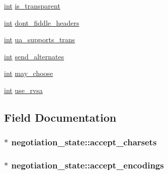 \begin{DoxyCompactItemize}
\item 
\hyperlink{pcre_8txt_a42dfa4ff673c82d8efe7144098fbc198}{int} \hyperlink{structnegotiation__state_aefbdd6257c23b35981e969ee62f8b8cf}{is\+\_\+transparent}
\item 
\hyperlink{pcre_8txt_a42dfa4ff673c82d8efe7144098fbc198}{int} \hyperlink{structnegotiation__state_ac546c8dabe2405c173572249af1453be}{dont\+\_\+fiddle\+\_\+headers}
\item 
\hyperlink{pcre_8txt_a42dfa4ff673c82d8efe7144098fbc198}{int} \hyperlink{structnegotiation__state_a99b8e250b291c99421c16c47163d8c01}{ua\+\_\+supports\+\_\+trans}
\item 
\hyperlink{pcre_8txt_a42dfa4ff673c82d8efe7144098fbc198}{int} \hyperlink{structnegotiation__state_a33db111ded7aa5a6a4f8a1aadbfc480f}{send\+\_\+alternates}
\item 
\hyperlink{pcre_8txt_a42dfa4ff673c82d8efe7144098fbc198}{int} \hyperlink{structnegotiation__state_a618e46a88ccc6076d3aff3c3e44569f2}{may\+\_\+choose}
\item 
\hyperlink{pcre_8txt_a42dfa4ff673c82d8efe7144098fbc198}{int} \hyperlink{structnegotiation__state_a62377e38615a3ce358ccd3444c498246}{use\+\_\+rvsa}
\end{DoxyCompactItemize}


\subsection{Field Documentation}
\subsubsection[{\texorpdfstring{accept\+\_\+charsets}{accept_charsets}}]{$\ast$ negotiation\+\_\+state\+::accept\+\_\+charsets}\hypertarget{structnegotiation__state_a06ce15ab1c57a71d51c06fab6c20a9c9}{}\label{structnegotiation__state_a06ce15ab1c57a71d51c06fab6c20a9c9}
\subsubsection[{\texorpdfstring{accept\+\_\+encodings}{accept_encodings}}]{$\ast$ negotiation\+\_\+state\+::accept\+\_\+encodings}\hypertarget{structnegotiation__state_ac95815749edf85bc8188bbf8945cb4ca}{}\label{structnegotiation__state_ac95815749edf85bc8188bbf8945cb4ca}

